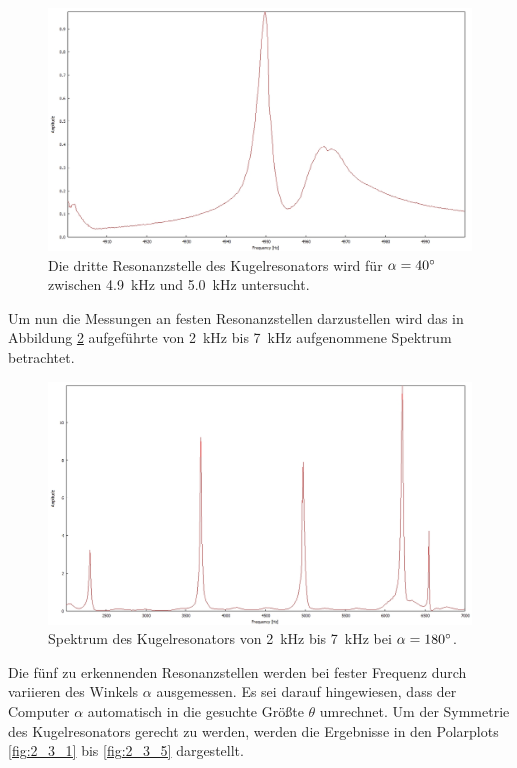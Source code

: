 \begin{figure}
\centering
\includegraphics[width=\textwidth]{content/messungen/Chapter2new/2_2_40mg.jpg}
\caption{Die dritte Resonanzstelle des Kugelresonators wird für $\alpha=40\degree$ zwischen 4.9~kHz und 5.0~kHz untersucht.}
\label{fig:2_2_40}
\end{figure}
Um nun die Messungen an festen Resonanzstellen darzustellen wird das in Abbildung \ref{fig:2_3_180} aufgeführte von 2~kHz bis 7~kHz aufgenommene Spektrum betrachtet.
\begin{figure}
\centering
\includegraphics[width=\textwidth]{content/messungen/Chapter2new/2_3_180mg.jpg}
\caption{Spektrum des Kugelresonators von 2~kHz bis 7~kHz bei $\alpha=180\degree$.}
\label{fig:2_3_180}
\end{figure}
Die fünf zu erkennenden Resonanzstellen werden bei fester Frequenz durch variieren des Winkels $\alpha$ ausgemessen.
Es sei darauf hingewiesen, dass der Computer $\alpha$ automatisch in die gesuchte Größte $\theta$ umrechnet.
Um der Symmetrie des Kugelresonators gerecht zu werden, werden die Ergebnisse in den Polarplots \ref{fig:2_3_1} bis \ref{fig:2_3_5} dargestellt.
